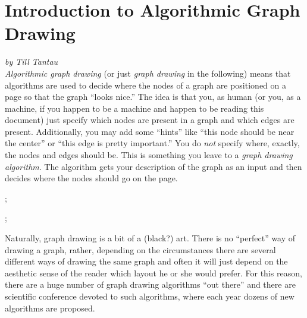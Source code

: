 %
%
%


\section{Introduction to Algorithmic Graph Drawing}

{\noindent\emph{by Till Tantau}}
\\

\emph{Algorithmic graph drawing} (or just \emph{graph drawing} in the
following) means that algorithms are used to decide where the nodes of
a graph are positioned on a page so that the graph ``looks nice.'' The
idea is that you, as human (or you, as a machine, if you happen to be
a machine and happen to be reading this document) just specify which
nodes are present in a graph and which edges are
present. Additionally, you may add some ``hints'' like ``this node
should be near the center'' or ``this edge is pretty important.'' You
do \emph{not} specify where, exactly, the nodes and edges should
be. This is something you leave to a \emph{graph drawing
  algorithm}. The algorithm gets your description of the graph as an
input and then decides where the nodes should go on the page.

\begin{codeexample}[]
\tikz {};
\end{codeexample}

\begin{codeexample}[]
\tikz {};  
\end{codeexample}

Naturally, graph drawing is a bit of a (black?) art. There is no
``perfect'' way of drawing a graph, rather, depending on the
circumstances there are several different ways of drawing the same
graph and often it will just depend on the aesthetic sense of the
reader which layout he or she would prefer. For this reason, there are
a huge number of graph drawing algorithms ``out there'' and there are
scientific conference devoted to such algorithms, where each
year dozens of new algorithms are proposed.

